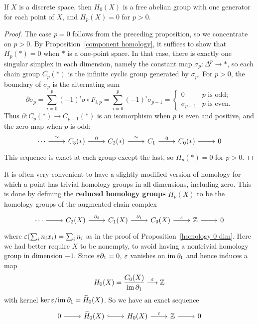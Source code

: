 \begin{proposition}\label{homology point}
If $X$ is a discrete space, then $H_0(X)$ is a free abelian group with one generator for each point of $X$, and $H_p(X)=0$ for $p>0$.
\end{proposition}
\begin{proof}
The case $p=0$ follows from the preceding proposition, so we concentrate
on $p>0$. By Proposition~\ref{component homology}, it suffices to show that $H_p(\ast)=0$ when $\ast$ is a one-point space. In that case, there is exactly one singular simplex in each dimension, namely the constant map $\sigma_p:\Delta^p\to\ast$, so each chain group $C_p(\ast)$ is the infinite cyclic group generated by $\sigma_p$. For $p>0$, the boundary of $\sigma_p$ is the alternating sum
\[\partial\sigma_p=\sum_{i=0}^{p}(-1)^i\sigma\circ F_{i,p}=\sum_{i=0}^{p}(-1)^i\sigma_{p-1}=\begin{cases}
0&p\text{ is odd};\\
\sigma_{p-1}&p\text{ is even}.
\end{cases}\]
Thus $\partial:C_p(\ast)\to C_{p-1}(\ast)$ is an isomorphism when $p$ is even and positive, and the zero map when $p$ is odd:
\[\begin{tikzcd}
\cdots\ar[r,"\cong"]&C_3(\ast)\ar[r,"0"]&C_2(\ast)\ar[r,"\cong"]&C_1\ar[r,"0"]&C_0(\ast)\ar[r]&0
\end{tikzcd}\]
This sequence is exact at each group except the last, so $H_p(\ast)=0$ for $p>0$.
\end{proof}
It is often very convenient to have a slightly modified version of homology for which a point has trivial homology groups in all dimensions, including zero. This is done by defining the \textbf{reduced homology groups} $\widetilde{H}_p(X)$ to be the homology groups of the augmented chain complex
\[\begin{tikzcd}
\cdots\ar[r]&C_2(X)\ar[r,"\partial_2"]&C_1(X)\ar[r,"\partial_1"]&C_0(X)\ar[r,"\eps"]&\Z\ar[r]&0
\end{tikzcd}\]
where $\varepsilon(\sum_in_ix_i)=\sum_in_i$ as in the proof of Proposition~\ref{homology 0 dim}. Here we had better
require $X$ to be nonempty, to avoid having a nontrivial homology group in dimension $-1$. Since $\varepsilon\partial_1=0$, $\varepsilon$ vanishes on $\mathrm{im}\,\partial_1$ and hence induces a map 
\[H_0(X)=\dfrac{C_0(X)}{\mathrm{im}\,\partial_1}\stackrel{\varepsilon}{\longrightarrow}\mathbb{Z}\]
with kernel $\mathrm{ker}\,\varepsilon/\mathrm{im}\,\partial_1=\widetilde{H}_0(X)$. So we have an exact sequence
\[\begin{tikzcd}
0\ar[r]&\widetilde{H}_0(X)\ar[r,hook]&H_0(X)\ar[r,"\eps"]&\Z\ar[r]&0
\end{tikzcd}\] 
